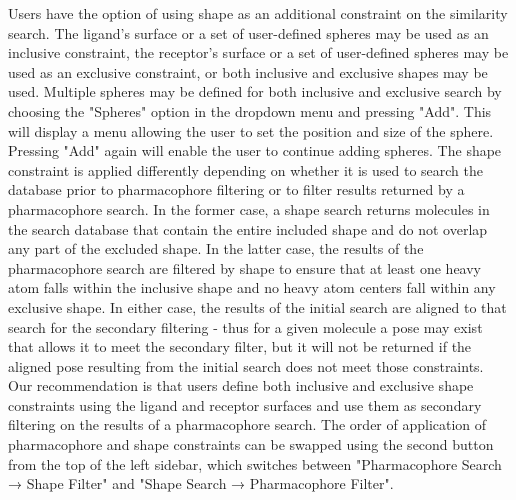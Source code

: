 \cite{matchpack}\cite{vams}
Users have the option of using shape as an additional constraint on the similarity search. The ligand's surface or a set of user-defined spheres may be used as an inclusive constraint, the receptor's surface or a set of user-defined spheres may be used as an exclusive constraint, or both inclusive and exclusive shapes may be used. Multiple spheres may be defined for both inclusive and exclusive search by choosing the "Spheres" option in the dropdown menu and pressing "Add". This will display a menu allowing the user to set the position and size of the sphere. Pressing "Add" again will enable the user to continue adding spheres. The shape constraint is applied differently depending on whether it is used to search the database prior to pharmacophore filtering or to filter results returned by a pharmacophore search. In the former case, a shape search returns molecules in the search database that contain the entire included shape and do not overlap any part of the excluded shape. In the latter case, the results of the pharmacophore search are filtered by shape to ensure that at least one heavy atom falls within the inclusive shape and no heavy atom centers fall within any exclusive shape. In either case, the results of the initial search are aligned to that search for the secondary filtering - thus for a given molecule a pose may exist that allows it to meet the secondary filter, but it will not be returned if the aligned pose resulting from the initial search does not meet those constraints. Our recommendation is that users define both inclusive and exclusive shape constraints using the ligand and receptor surfaces and use them as secondary filtering on the results of a pharmacophore search. The order of application of pharmacophore and shape constraints can be swapped using the second button from the top of the left sidebar, which switches between "Pharmacophore Search → Shape Filter" and "Shape Search → Pharmacophore Filter".
